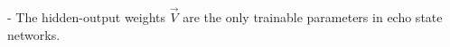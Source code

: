\begin{frame}\frametitle{\subsecname}

		
		
\pause

        - The hidden-output weights $\vec V$ are the only trainable parameters in echo state networks.


\end{frame}
